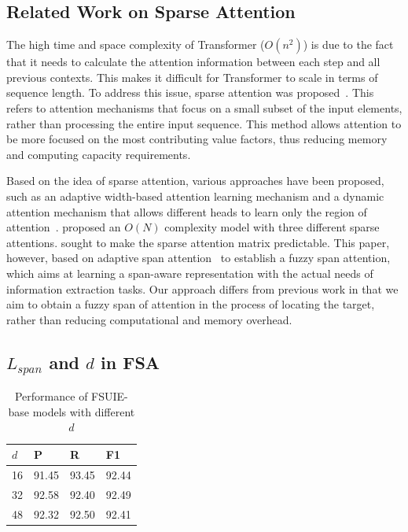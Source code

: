 \documentclass[11pt]{article}
\begin{document}
\subsection{Related Work on Sparse Attention}


The high time and space complexity of Transformer ($O(n^2)$) is due to the fact that it needs to calculate the attention information between each step and all previous contexts. This makes it difficult for Transformer to scale in terms of sequence length. To address this issue, sparse attention was proposed~\cite{DBLP:journals/corr/abs-1904-10509}. This refers to attention mechanisms that focus on a small subset of the input elements, rather than processing the entire input sequence. This method allows attention to be more focused on the most contributing value factors, thus reducing memory and computing capacity requirements.


Based on the idea of sparse attention, various approaches have been proposed, such as an adaptive width-based attention learning mechanism and a dynamic attention mechanism that allows different heads to learn only the region of attention~\cite{sukhbaatar-etal-2019-adaptive}. \citet{ DBLP:conf/nips/ZaheerGDAAOPRWY20} proposed an $O(N)$ complexity model with three different sparse attentions. \citet{ zhuang-etal-2022-long} sought to make the sparse attention matrix predictable. This paper, however, based on adaptive span attention~\cite{sukhbaatar-etal-2019-adaptive} to establish a fuzzy span attention, which aims at learning a span-aware representation with the actual needs of information extraction tasks. Our approach differs from previous work in that we aim to obtain a fuzzy span of attention in the process of locating the target, rather than reducing computational and memory overhead.

\subsection{$L_{span}$ and $d$ in FSA}
\begin{table}[!ht]
    \centering
    \small
    \begin{tabular}{llll}
        \toprule
        \textbf{$d$} & \textbf{P} & \textbf{R} & \textbf{F1 } \\ 
        \midrule
        16 & 91.45 & 93.45 & 92.44  \\ 
        32 & 92.58 & 92.40 & 92.49  \\ 
        48 & 92.32 & 92.50 & 92.41  \\ 
        \bottomrule
    \end{tabular}
    \caption{Performance of FSUIE-base models with different $d$}
    \label{tab:different_d_results}
\end{table}
\end{document}
